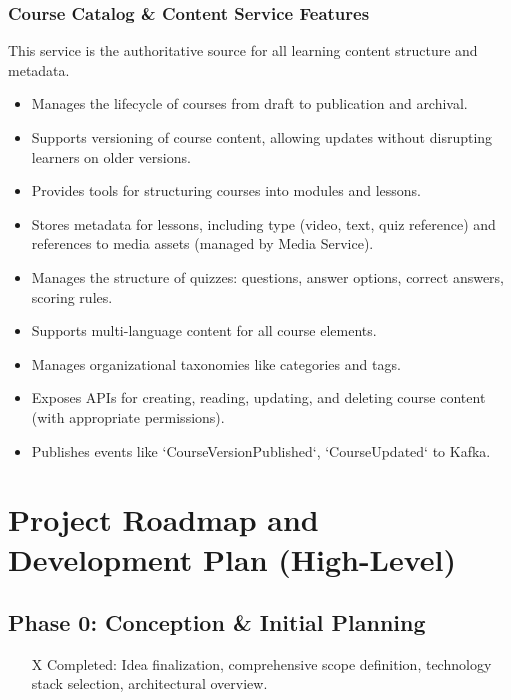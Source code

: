 \documentclass[12pt, a4paper]{report} %
\begin{document}
\begin{itemize}
  \subsection{Course Catalog \& Content Service Features}
    This service is the authoritative source for all learning content structure and metadata.
    \begin{itemize}
        \item Manages the lifecycle of courses from draft to publication and archival.
        \item Supports versioning of course content, allowing updates without disrupting learners on older versions.
        \item Provides tools for structuring courses into modules and lessons.
        \item Stores metadata for lessons, including type (video, text, quiz reference) and references to media assets (managed by Media Service).
        \item Manages the structure of quizzes: questions, answer options, correct answers, scoring rules.
        \item Supports multi-language content for all course elements.
        \item Manages organizational taxonomies like categories and tags.
        \item Exposes APIs for creating, reading, updating, and deleting course content (with appropriate permissions).
        \item Publishes events like `CourseVersionPublished`, `CourseUpdated` to Kafka.
    \end{itemize}

\chapter{Project Roadmap and Development Plan (High-Level)}
\section{Phase 0: Conception \& Initial Planning}
  \begin{itemize}
    \item [X] Completed: Idea finalization, comprehensive scope definition, technology stack selection, architectural overview.
  \end{itemize}

\end{itemize}
\end{document}
